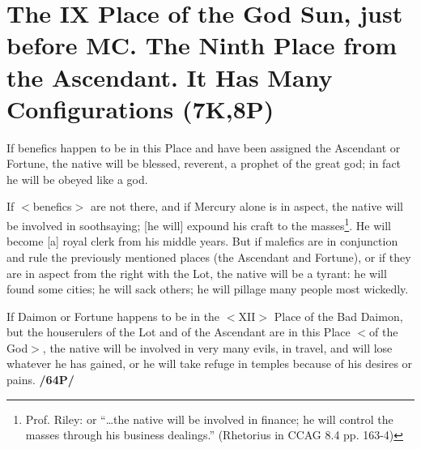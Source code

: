\section*{The IX Place of the God Sun, just before MC. The Ninth 
Place from the Ascendant. It Has Many Configurations (7K,8P)}

If benefics happen to be in this Place and have been assigned the Ascendant or Fortune, the native will be blessed, reverent, a prophet of the great god; in fact he will be obeyed like a god.

If $<$benefics$>$ are not there, and if Mercury alone is in aspect, the native will be involved in soothsaying; [he will] expound his craft to the masses\footnote{Prof. Riley: or “…the native will be involved in finance; he will control the masses through his business dealings.” (Rhetorius in CCAG 8.4 pp. 163-4)}. He will become [a] royal clerk from his middle years. But if malefics are in conjunction and rule the previously mentioned places (the Ascendant and Fortune), or if they are in aspect from the right with the Lot, the native will be a tyrant: he will found some cities; he will sack others; he will pillage many people most wickedly. 

If Daimon or Fortune happens to be in the $<$XII$>$ Place of the Bad Daimon, but the houserulers of the Lot and of the Ascendant are in this Place $<$of the God$>$, the native will be involved in very many evils, in travel, and will lose whatever he has gained, or he will take refuge in temples because of his desires or pains. \textbf{/64P/}

\newpage